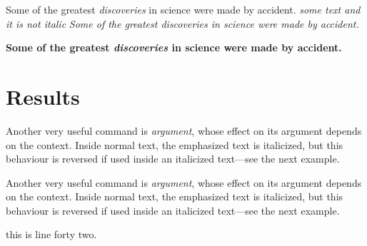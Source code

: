 \documentclass[12pt, a4paper]{article}
\begin{document}
Some of the greatest \emph{discoveries} in science 
were made by accident.
\textit{some text and it is not \emph{italic} }
\textit{Some of the greatest \emph{discoveries} 
in science were made by accident.}

\textbf{Some of the greatest \emph{discoveries} 
in science were made by accident.}


\section{Results}
Another very useful command is \emph{argument}, whose effect on its argument depends on the context. Inside normal text, the emphasized text is italicized, but this behaviour is reversed if used inside an italicized text—see the next example. 
\par

\noindent Another very useful command is \emph{argument}, whose effect on its argument depends on the context. Inside normal text, the emphasized text is italicized, but this behaviour is reversed if used inside an italicized text—see the next example.

this is line forty two. 
\end{document}
